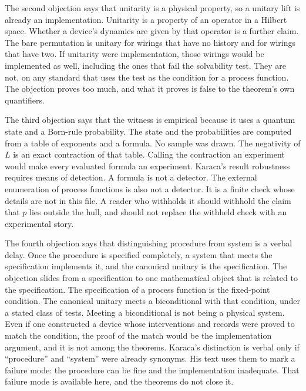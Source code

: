 \documentclass[12pt]{article}
\begin{document}
The second objection says that unitarity is a physical property, so a unitary lift is already an implementation. Unitarity is a property of an operator in a Hilbert space. Whether a device's dynamics are given by that operator is a further claim. The bare permutation is unitary for wirings that have no history and for wirings that have two. If unitarity were implementation, those wirings would be implemented as well, including the ones that fail the solvability test. They are not, on any standard that uses the test as the condition for a process function. The objection proves too much, and what it proves is false to the theorem's own quantifiers.

The third objection says that the witness is empirical because it uses a quantum state and a Born-rule probability. The state and the probabilities are computed from a table of exponents and a formula. No sample was drawn. The negativity of \(L\) is an exact contraction of that table. Calling the contraction an experiment would make every evaluated formula an experiment. Karaca's result robustness requires means of detection. A formula is not a detector. The external enumeration of process functions is also not a detector. It is a finite check whose details are not in this file. A reader who withholds it should withhold the claim that \(p\) lies outside the hull, and should not replace the withheld check with an experimental story.

The fourth objection says that distinguishing procedure from system is a verbal delay. Once the procedure is specified completely, a system that meets the specification implements it, and the canonical unitary is the specification. The objection slides from a specification to one mathematical object that is related to the specification. The specification of a process function is the fixed-point condition. The canonical unitary meets a biconditional with that condition, under a stated class of tests. Meeting a biconditional is not being a physical system. Even if one constructed a device whose interventions and records were proved to match the condition, the proof of the match would be the implementation argument, and it is not among the theorems. Karaca's distinction is verbal only if ``procedure'' and ``system'' were already synonyms. His text uses them to mark a failure mode: the procedure can be fine and the implementation inadequate. That failure mode is available here, and the theorems do not close it.
\end{document}
